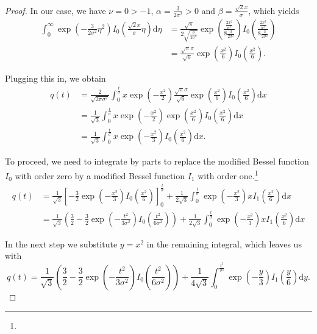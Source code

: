 \documentclass[a4paper,12pt]{article}
\theoremstyle{plain}
\theoremstyle{definition}
\begin{document}
\begin{proof}
	In our case, we have $\nu = 0 > -1$, $\alpha = \frac{3}{2 \sigma^2} > 0$ and $\beta = \frac{\sqrt{2} x}{\sigma}$, which yields
	\begin{align*}
		\int_0^\infty \exp \left( - \frac{3}{2 \sigma^2} \eta^2 \right) I_0 \left( \frac{\sqrt{2} x}{\sigma} \eta \right) \mathrm{d}\eta &= \frac{\sqrt{\pi}}{2 \sqrt{\frac{3}{2 \sigma^2}}} \exp \left( \frac{\frac{2 x^2}{\sigma^2}}{8 \frac{3}{2 \sigma^2}} \right) I_0 \left( \frac{\frac{2 x^2}{\sigma^2}}{8 \frac{3}{2 \sigma^2}} \right) \\
		&= \frac{\sqrt{\pi} \sigma}{\sqrt{6}} \exp \left( \frac{x^2}{6} \right) I_0 \left( \frac{x^2}{6} \right).
	\end{align*}
	
	Plugging this in, we obtain
	\begin{align*}
		q(t) &= \frac{2}{\sqrt{2 \pi \sigma^2}} \int_0^\frac{t}{\sigma} x \exp \left( - \frac{x^2}{2} \right) \frac{\sqrt{\pi} \sigma}{\sqrt{6}} \exp \left( \frac{x^2}{6} \right) I_0 \left( \frac{x^2}{6} \right) \mathrm{d}x \\
		&= \frac{1}{\sqrt{3}} \int_0^\frac{t}{\sigma} x \exp \left( - \frac{x^2}{2} \right) \exp \left( \frac{x^2}{6} \right) I_0 \left( \frac{x^2}{6} \right) \mathrm{d}x \\
		&= \frac{1}{\sqrt{3}} \int_0^\frac{t}{\sigma} x \exp \left( - \frac{x^2}{3} \right) I_0 \left( \frac{x^2}{6} \right) \mathrm{d}x.
	\end{align*}
	
	To proceed, we need to integrate by parts to replace the modified Bessel function $I_0$ with order zero by a modified Bessel function $I_1$ with order one.\footnote{}
	\begin{align*}
		q(t) &= \frac{1}{\sqrt{3}} \left[ - \frac{3}{2} \exp \left( - \frac{x^2}{3} \right) I_0 \left( \frac{x^2}{6} \right) \right]_0^\frac{t}{\sigma} + \frac{1}{2 \sqrt{3}} \int_0^\frac{t}{\sigma} \exp \left( - \frac{x^2}{3} \right) x I_1 \left( \frac{x^2}{6} \right) \mathrm{d}x \\
		&= \frac{1}{\sqrt{3}} \left( \frac{3}{2} - \frac{3}{2} \exp \left( - \frac{t^2}{3 \sigma^2} \right) I_0 \left( \frac{t^2}{6 \sigma^2} \right) \right) + \frac{1}{2 \sqrt{3}} \int_0^\frac{t}{\sigma} \exp \left( - \frac{x^2}{3} \right) x I_1 \left( \frac{x^2}{6} \right) \mathrm{d}x
	\end{align*}
	
	In the next step we substitute $y = x^2$ in the remaining integral, which leaves us with
	\begin{equation*}
		q(t) = \frac{1}{\sqrt{3}} \left( \frac{3}{2} - \frac{3}{2} \exp \left( - \frac{t^2}{3 \sigma^2} \right) I_0 \left( \frac{t^2}{6 \sigma^2} \right) \right) + \frac{1}{4 \sqrt{3}} \int_0^\frac{t^2}{\sigma^2} \exp \left( - \frac{y}{3} \right) I_1 \left( \frac{y}{6} \right) \mathrm{d}y.
	\end{equation*}
	

\end{proof}
\end{document}
